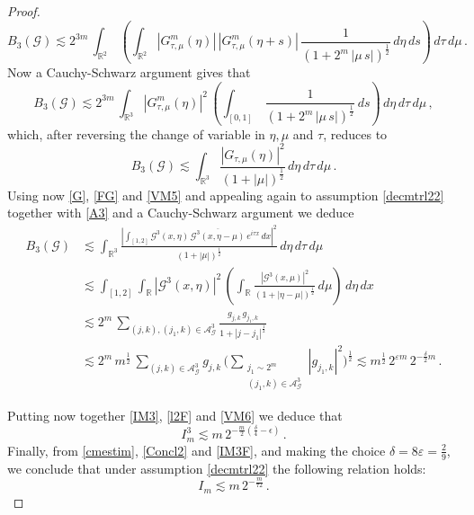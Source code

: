 \documentclass[a4paper,reqno]{amsart}
\numberwithin{equation}{section}
\theoremstyle{definition}
\newcommand{\R}{\mathbb{R}}
\def\G{\mathcal{G}}
\def\v{\varepsilon}
\def\A{\mathcal{A}}
\def\d{\delta}
\def\ep{\epsilon}
\begin{document}
\begin{proof}
\begin{equation}
	B_3(\G)\lesssim 2^{3m}\,\int_{\R^2}\,\left(\int_{\R^2} |G^{m}_{\tau,\mu}(\eta)|\,|G^{m}_{\tau,\mu}(\eta+s)|\,
	\frac{1}{(1+2^m\,|\mu\,s|)^{\frac{1}{2}}}\,d\eta\,ds\right)\,d\tau\,d\mu\,.
\end{equation}
Now a Cauchy-Schwarz argument gives that
\begin{equation}\label{VM4}
	B_3(\G)\lesssim 2^{3m}\,\int_{\R^3} |G^{m}_{\tau,\mu}(\eta)|^2\,\left(\int_{[0,1]}\,
	\frac{1}{(1+2^m\,|\mu\,s|)^{\frac{1}{2}}}\,ds\right)\,d\eta\,d\tau\,d\mu\,,
\end{equation}
which, after reversing the change of variable in $\eta, \mu$ and $\tau$, reduces to
\begin{equation}\label{VM5}
	B_3(\G)\lesssim \int_{\R^3} \frac{|G_{\tau,\mu}(\eta)|^2}{(1+|\mu|)^{\frac{1}{2}}}\,d\eta\,d\tau\,d\mu\,.
\end{equation}
Using now \eqref{G}, \eqref{FG} and \eqref{VM5} and appealing again to assumption \eqref{decmtrl22} together with \eqref{A3} and a Cauchy-Schwarz argument we deduce
\begin{align}
	B_3(\G)&\lesssim \int_{\R^3} \frac{|\int_{[1,2]} \G^3(x,\eta)\,\overline{\G^3(x,\eta-\mu)}\,e^{i \tau x}\,dx |^2}{(1+|\mu|)^{\frac{1}{2}}}\,d\eta\,d\tau\,d\mu\nonumber\\[1ex]
	&\lesssim \int_{[1,2]} \int_{\R}  |\G^3(x,\eta)|^2\,\left(\int_{\R}\frac{|\G^3(x,\mu)|^2}{(1+|\eta-\mu|)^{\frac{1}{2}}}\,d\mu\right) \,d\eta\,d x  \nonumber\\[1ex]	
	&\lesssim 2^{m}\,\sum_{(j,k),(j_1,k)\in\A_{\G}^{3}} \frac{g_{j,k}\,g_{j_1,k}}{1+|j-j_1|^{\frac{1}{2}}}  \nonumber\\
	&\lesssim 2^{m}\,m^{\frac{1}{2}}\,\sum_{(j,k)\in\A_{\G}^{3}} g_{j,k}\,
	\Bigg(\sum_{\substack{j_1\sim 2^m\\(j_1,k)\in\A_{\G}^{3}}} |g_{j_1,k}|^2\Bigg)^{\frac{1}{2}}\lesssim
m^{\frac{1}{2}}\,2^{\v m}\,2^{-\frac{\d}{2}m}\,. \label{VM6}
\end{align}


Putting now together \eqref{IM3}, \eqref{l2F} and  \eqref{VM6} we deduce that
\begin{equation}\label{IM3F}
	I_m^3\lesssim m\,2^{-\frac{m}{2}(\frac{\d}{4}-\ep)}\,.
\end{equation}
Finally, from \eqref{cmestim}, \eqref{Concl2} and \eqref{IM3F}, and making the choice $\d=8\v=\frac{2}{9}$, we conclude that under assumption \eqref{decmtrl22} the following relation holds:
\begin{equation}\label{Conc}
	I_m\lesssim m\,2^{-\frac{m}{72}}\,.
\end{equation}


\end{proof}
\end{document}
